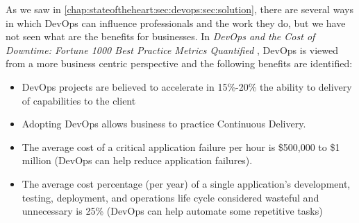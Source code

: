       As we saw in \ref{chap:stateoftheheart:sec:devops:sec:solution}, there are several ways in which DevOps can influence professionals and the work they do, but we have not seen what are the benefits for businesses. In \textit{DevOps and the Cost of Downtime: Fortune 1000 Best Practice Metrics Quantified} \cite{Elliot2015}, DevOps is viewed from a more business centric perspective and the following benefits are identified:

		  \begin{itemize}
			    \item{DevOps projects are believed to accelerate in 15\%-20\% the ability to delivery of capabilities to the client }
          \item{Adopting DevOps allows business to practice Continuous Delivery.}
          \item{The average cost of a critical application failure per hour is \$500,000 to \$1 million (DevOps can help reduce application failures).}
          \item{The average cost percentage (per year) of a single application's development, testing, deployment, and operations life cycle considered wasteful and unnecessary is 25\% (DevOps can help automate some repetitive tasks)}
		  \end{itemize}

